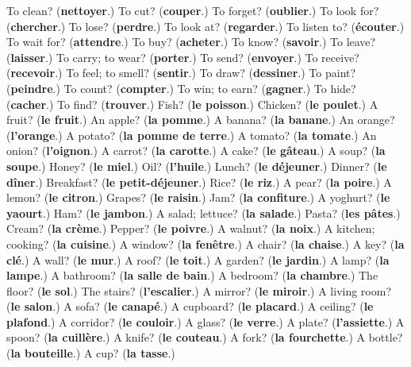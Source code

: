 \begin{tcolorbox}[breakable,colback=teal!4,colframe=teal!35!black,title={Before you move on}]
To clean? (\textbf{nettoyer}.) To cut? (\textbf{couper}.) To forget? (\textbf{oublier}.) To look for? (\textbf{chercher}.) To lose? (\textbf{perdre}.) To look at? (\textbf{regarder}.) To listen to? (\textbf{écouter}.) To wait for? (\textbf{attendre}.) To buy? (\textbf{acheter}.) To know? (\textbf{savoir}.) To leave? (\textbf{laisser}.) To carry; to wear? (\textbf{porter}.) To send? (\textbf{envoyer}.) To receive? (\textbf{recevoir}.) To feel; to smell? (\textbf{sentir}.) To draw? (\textbf{dessiner}.) To paint? (\textbf{peindre}.) To count? (\textbf{compter}.) To win; to earn? (\textbf{gagner}.) To hide? (\textbf{cacher}.) To find? (\textbf{trouver}.) Fish? (\textbf{le poisson}.) Chicken? (\textbf{le poulet}.) A fruit? (\textbf{le fruit}.) An apple? (\textbf{la pomme}.) A banana? (\textbf{la banane}.) An orange? (\textbf{l'orange}.) A potato? (\textbf{la pomme de terre}.) A tomato? (\textbf{la tomate}.) An onion? (\textbf{l'oignon}.) A carrot? (\textbf{la carotte}.) A cake? (\textbf{le gâteau}.) A soup? (\textbf{la soupe}.) Honey? (\textbf{le miel}.) Oil? (\textbf{l'huile}.) Lunch? (\textbf{le déjeuner}.) Dinner? (\textbf{le dîner}.) Breakfast? (\textbf{le petit-déjeuner}.) Rice? (\textbf{le riz}.) A pear? (\textbf{la poire}.) A lemon? (\textbf{le citron}.) Grapes? (\textbf{le raisin}.) Jam? (\textbf{la confiture}.) A yoghurt? (\textbf{le yaourt}.) Ham? (\textbf{le jambon}.) A salad; lettuce? (\textbf{la salade}.) Pasta? (\textbf{les pâtes}.) Cream? (\textbf{la crème}.) Pepper? (\textbf{le poivre}.) A walnut? (\textbf{la noix}.) A kitchen; cooking? (\textbf{la cuisine}.) A window? (\textbf{la fenêtre}.) A chair? (\textbf{la chaise}.) A key? (\textbf{la clé}.) A wall? (\textbf{le mur}.) A roof? (\textbf{le toit}.) A garden? (\textbf{le jardin}.) A lamp? (\textbf{la lampe}.) A bathroom? (\textbf{la salle de bain}.) A bedroom? (\textbf{la chambre}.) The floor? (\textbf{le sol}.) The stairs? (\textbf{l'escalier}.) A mirror? (\textbf{le miroir}.) A living room? (\textbf{le salon}.) A sofa? (\textbf{le canapé}.) A cupboard? (\textbf{le placard}.) A ceiling? (\textbf{le plafond}.) A corridor? (\textbf{le couloir}.) A glass? (\textbf{le verre}.) A plate? (\textbf{l'assiette}.) A spoon? (\textbf{la cuillère}.) A knife? (\textbf{le couteau}.) A fork? (\textbf{la fourchette}.) A bottle? (\textbf{la bouteille}.) A cup? (\textbf{la tasse}.)
\end{tcolorbox}
